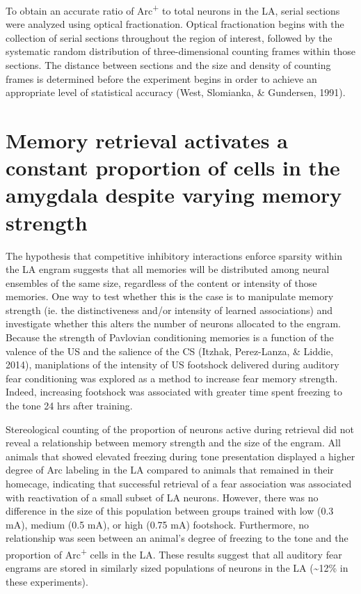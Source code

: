 \documentclass[12pt,a4paperpaper,]{report}
\begin{document}
To obtain an accurate ratio of Arc\textsuperscript{+} to total neurons
in the LA, serial sections were analyzed using optical fractionation.
Optical fractionation begins with the collection of serial sections
throughout the region of interest, followed by the systematic random
distribution of three-dimensional counting frames within those sections.
The distance between sections and the size and density of counting
frames is determined before the experiment begins in order to achieve an
appropriate level of statistical accuracy (West, Slomianka, \&
Gundersen, 1991).

\section{Memory retrieval activates a constant proportion of cells in
the amygdala despite varying memory
strength}\label{memory-retrieval-activates-a-constant-proportion-of-cells-in-the-amygdala-despite-varying-memory-strength-1}

The hypothesis that competitive inhibitory interactions enforce sparsity
within the LA engram suggests that all memories will be distributed
among neural ensembles of the same size, regardless of the content or
intensity of those memories. One way to test whether this is the case is
to manipulate memory strength (ie. the distinctiveness and/or intensity
of learned associations) and investigate whether this alters the number
of neurons allocated to the engram. Because the strength of Pavlovian
conditioning memories is a function of the valence of the US and the
salience of the CS (Itzhak, Perez-Lanza, \& Liddie, 2014), maniplations
of the intensity of US footshock delivered during auditory fear
conditioning was explored as a method to increase fear memory strength.
Indeed, increasing footshock was associated with greater time spent
freezing to the tone 24 hrs after training.

Stereological counting of the proportion of neurons active during
retrieval did not reveal a relationship between memory strength and the
size of the engram. All animals that showed elevated freezing during
tone presentation displayed a higher degree of Arc labeling in the LA
compared to animals that remained in their homecage, indicating that
successful retrieval of a fear association was associated with
reactivation of a small subset of LA neurons. However, there was no
difference in the size of this population between groups trained with
low (0.3 mA), medium (0.5 mA), or high (0.75 mA) footshock. Furthermore,
no relationship was seen between an animal's degree of freezing to the
tone and the proportion of Arc\textsuperscript{+} cells in the LA. These
results suggest that all auditory fear engrams are stored in similarly
sized populations of neurons in the LA (\textasciitilde{}12\% in these
experiments).
\end{document}
